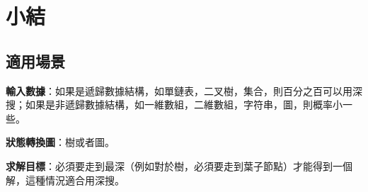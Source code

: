 \section{小結} %
\label{sec:dfs-template}


\subsection{適用場景}

\textbf{輸入數據}：如果是遞歸數據結構，如單鏈表，二叉樹，集合，則百分之百可以用深搜；如果是非遞歸數據結構，如一維數組，二維數組，字符串，圖，則概率小一些。

\textbf{狀態轉換圖}：樹或者圖。

\textbf{求解目標}：必須要走到最深（例如對於樹，必須要走到葉子節點）才能得到一個解，這種情況適合用深搜。


